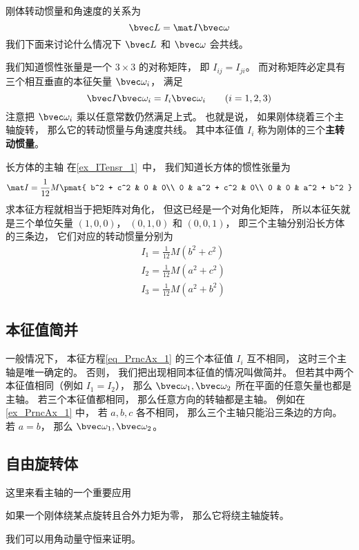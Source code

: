 
\begin{issues}
\issueDraft
\end{issues}


刚体转动惯量和角速度的关系为
\begin{equation}
\bvec L = \mat I \bvec \omega
\end{equation}
我们下面来讨论什么情况下 $\bvec L$ 和 $\bvec \omega$ 会共线。

我们知道惯性张量是一个 $3\times 3$ 的对称矩阵， 即 $I_{ij} = I_{ji}$。 而对称矩阵必定具有三个相互垂直的本征矢量 $\bvec \omega_i$， 满足
\begin{equation}\label{eq_PrncAx_1}
\bvec I \bvec \omega_i = I_i \bvec \omega_i \qquad (i = 1,2,3)
\end{equation}
注意把 $\bvec \omega_i$ 乘以任意常数仍然满足上式。 也就是说， 如果刚体绕着三个主轴旋转， 那么它的转动惯量与角速度共线。 其中本征值 $I_i$ 称为刚体的三个\textbf{主转动惯量}。

\begin{example}{长方体的主轴}\label{ex_PrncAx_1}
在\autoref{ex_ITensr_1}~中， 我们知道长方体的惯性张量为
\begin{equation}
\mat I = \frac{1}{12} M
\pmat{
   b^2 + c^2 & 0 & 0\\
   0 & a^2 + c^2 & 0\\
   0 & 0 & a^2 + b^2
}
\end{equation}
求本征方程就相当于把矩阵对角化， 但这已经是一个对角化矩阵， 所以本征矢就是三个单位矢量 $(1,0,0)$， $(0,1,0)$ 和 $(0,0,1)$， 即三个主轴分别沿长方体的三条边， 它们对应的转动惯量分别为
\begin{equation}
\begin{aligned}
&I_1 = \frac{1}{12}M(b^2+c^2)\\
&I_2 = \frac{1}{12}M(a^2+c^2)\\
&I_3 = \frac{1}{12}M(a^2+b^2)
\end{aligned}
\end{equation}
\end{example}

\subsection{本征值简并}
一般情况下， 本征方程\autoref{eq_PrncAx_1} 的三个本征值 $I_i$ 互不相同， 这时三个主轴是唯一确定的。 否则， 我们把出现相同本征值的情况叫做简并。 但若其中两个本征值相同（例如 $I_1 = I_2$）， 那么 $\bvec \omega_1, \bvec \omega_2$ 所在平面的任意矢量也都是主轴。 若三个本征值都相同， 那么任意方向的转轴都是主轴。 例如在\autoref{ex_PrncAx_1} 中， 若 $a,b,c$ 各不相同， 那么三个主轴只能沿三条边的方向。 若 $a = b$， 那么 $\bvec \omega_1, \bvec \omega_2$。

\subsection{自由旋转体}
这里来看主轴的一个重要应用
\begin{theorem}{}
如果一个刚体绕某点旋转且合外力矩为零， 那么它将绕主轴旋转。
\end{theorem}
我们可以用角动量守恒来证明。
